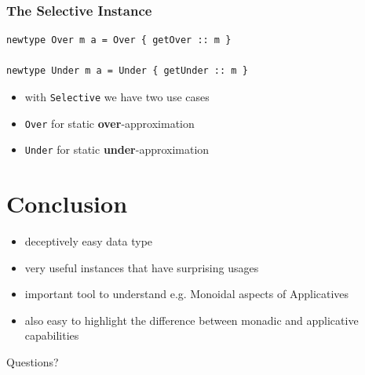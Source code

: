 \documentclass[aspectratio=169]{beamer}
\begin{document}
\begin{frame}[fragile]
  \frametitle{The Selective Instance}
  \begin{verbatim}
newtype Over m a = Over { getOver :: m }

newtype Under m a = Under { getUnder :: m }
  \end{verbatim}
  \vfill
  \begin{itemize}
  \item with \texttt{Selective} we have two use cases
  \item \texttt{Over} for static \textbf{over}-approximation
  \item \texttt{Under} for static \textbf{under}-approximation
  \end{itemize}
\end{frame}

\section{Conclusion}

\begin{frame}
  \begin{itemize}
  \item deceptively easy data type
  \item very useful instances that have surprising usages
  \item important tool to understand e.g. Monoidal aspects of
    Applicatives
  \item also easy to highlight the difference between monadic and
    applicative capabilities
  \end{itemize}
\end{frame}

\begin{frame}
  \Huge{}
  Questions?
\end{frame}

\appendix{}
\end{document}
